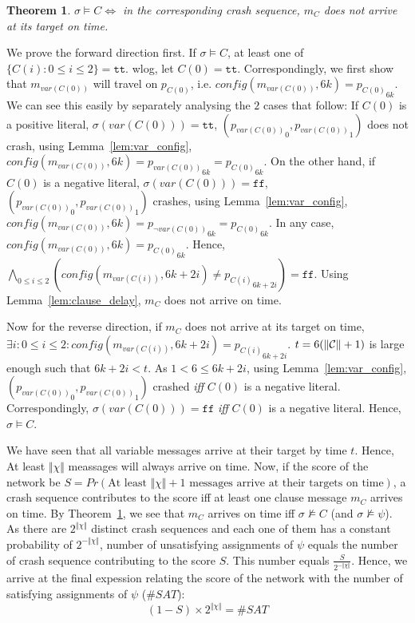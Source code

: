 \documentclass[11pt,eepic]{article}
\newcommand{\set}[1]{\{ #1  \}}
\newcommand{\C}{{\cal C}}
\renewcommand{\tt}{\texttt{tt}}
\newcommand{\ff}{\texttt{ff}}
\newtheorem{theorem}{Theorem}[section]
\def\eod{\vrule height 6pt width 5pt depth 0pt}
\newenvironment{proof}{\noindent {\bf Proof:} \hspace{.677em}}
	                      {\hspace*{\fill}{\eod}}
\begin{document}
		\begin{theorem}
		\label{lem:sigma_C_correlation}
		$\sigma \models C \iff$ in the corresponding crash sequence, $m_C$ does not arrive at its target on time.
		\end{theorem}
		\begin{proof}
		We prove the forward direction first. If $\sigma \models C$, at least one of $\set{C(i): 0\leq i\leq2} = \tt$. wlog, let $C(0)=\tt$. Correspondingly, we first show that $m_{var(C(0))}$ will travel on $p_{C(0)}$, i.e. $config(m_{var(C(0))},6k)={p_{C(0)}}_{6k}$. We can see this easily by separately analysing the $2$ cases that follow: If $C(0)$ is a positive literal, $\sigma(var(C(0))) = \tt$, $({p_{var(C(0))}}_0,{p_{var(C(0))}}_1)$ does not crash, using Lemma~\ref{lem:var_config}, $config(m_{var(C(0))},6k)={p_{var(C(0))}}_{6k}={p_{C(0)}}_{6k}$. On the other hand, if $C(0)$ is a negative literal, $\sigma(var(C(0))) = \ff$, $({p_{var(C(0))}}_0,{p_{var(C(0))}}_1)$ crashes, using Lemma~\ref{lem:var_config}, $config(m_{var(C(0))},6k)={p_{\neg var(C(0))}}_{6k}={p_{C(0)}}_{6k}$. In any case, $config(m_{var(C(0))},6k)={p_{C(0)}}_{6k}$. Hence, $\bigwedge_{0 \leq i \leq 2}(config(m_{var(C(i))},6k+2i)\ne{p_{C(i)}}_{6k+2i}) = \ff$. Using Lemma~\ref{lem:clause_delay}, $m_C$ does not arrive on time.

		Now for the reverse direction, if $m_C$ does not arrive at its target on time, $\exists i: 0 \leq i \leq 2: config(m_{var(C(i))},6k+2i)={p_{C(i)}}_{6k+2i}$. $t = 6(\Vert\C\Vert+1)$ is large enough such that $6k+2i < t$. As $1<6\leq6k+2i$, using Lemma~\ref{lem:var_config}, $({p_{var(C(0))}}_0,{p_{var(C(0))}}_1)$ crashed {\em iff} $C(0)$ is a negative literal. Correspondingly, $\sigma(var(C(0)))=\ff$ {\em iff} $C(0)$ is a negative literal. Hence, $\sigma\models C$.
		\end{proof}

		We have seen that all variable messages arrive at their target by time $t$. Hence, At least $\Vert\chi\Vert$ meassages will always arrive on time. Now, if the score of the network be $S = Pr(\text{At least }\Vert\chi\Vert+1\text{ messages arrive at their targets on time})$, a crash sequence contributes to the score iff at least one clause message $m_C$ arrives on time. By Theorem~\ref{lem:sigma_C_correlation}, we see that $m_C$ arrives on time iff $\sigma\nvDash C$ (and $\sigma\nvDash\psi$). As there are $2^{\Vert\chi\Vert}$ distinct crash sequences and each one of them has a constant probability of $2^{-\Vert\chi\Vert}$, number of unsatisfying assignments of $\psi$ equals the number of crash sequence contributing to the score $S$. This number equals $\frac{S}{2^{-\Vert\chi\Vert}}$. Hence, we arrive at the final expession relating the score of the network with the number of satisfying assignments of $\psi$ ($\#SAT$):
		$$(1-S)\times 2^{\Vert\chi\Vert} = \#SAT$$
\end{document}
